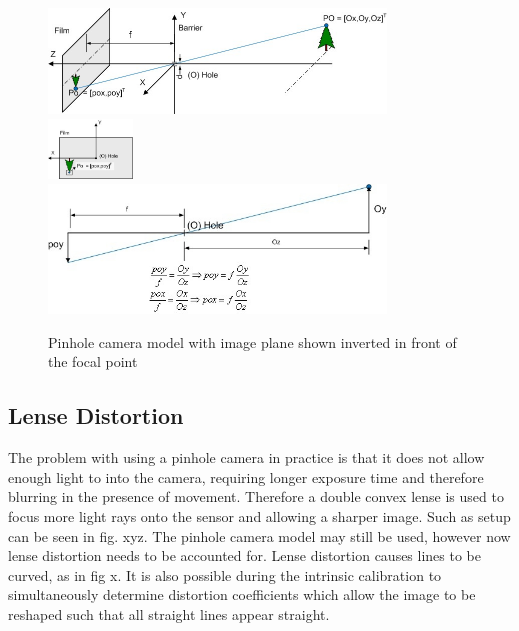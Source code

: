 \begin{figure}[h]
  \centering
    \includegraphics[width=0.8\textwidth]{chapters/images/cam_model_fig41} \\
    \includegraphics[width=0.2\textwidth]{chapters/images/cam_model_fig42} \\
    \includegraphics[width=0.8\textwidth]{chapters/images/cam_model_fig43} 
  \caption{Pinhole camera model with image plane shown inverted in front of the focal point}
\end{figure}


\subsection{Lense Distortion}
\label{subsec:lense_distortion}

The problem with using a pinhole camera in practice is that it does not allow enough light to into the camera, requiring longer exposure time and therefore blurring in the presence of movement. Therefore a double convex lense is used to focus more light rays onto the sensor and allowing a sharper image.  Such as setup can be seen in fig. xyz.  The pinhole camera model may still be used, however now lense distortion needs to be accounted for.  Lense distortion causes lines to be curved, as in fig x.  It is also possible during the intrinsic calibration to simultaneously determine distortion coefficients which allow the image to be reshaped such that all straight lines appear straight.

